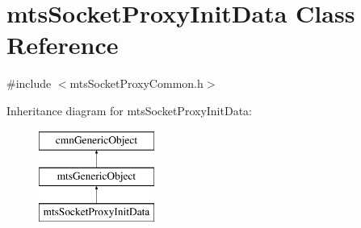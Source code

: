 \hypertarget{classmts_socket_proxy_init_data}{\section{mts\-Socket\-Proxy\-Init\-Data Class Reference}
\label{classmts_socket_proxy_init_data}
}


{\ttfamily \#include $<$mts\-Socket\-Proxy\-Common.\-h$>$}

Inheritance diagram for mts\-Socket\-Proxy\-Init\-Data\-:\begin{figure}[H]
\begin{center}
\leavevmode
\includegraphics[height=3.000000cm]{d6/de0/classmts_socket_proxy_init_data}
\end{center}
\end{figure}
